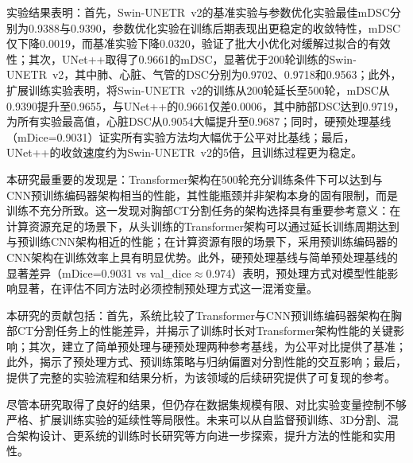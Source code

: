 \documentclass[12pt, a4paper]{article}
\begin{document}
实验结果表明：首先，Swin-UNETR~v2的基准实验与参数优化实验最佳mDSC分别为0.9388与0.9390，参数优化实验在训练后期表现出更稳定的收敛特性，mDSC仅下降0.0019，而基准实验下降0.0320，验证了批大小优化对缓解过拟合的有效性；其次，UNet++取得了0.9661的mDSC，显著优于200轮训练的Swin-UNETR~v2，其中肺、心脏、气管的DSC分别为0.9702、0.9718和0.9563；此外，扩展训练实验表明，将Swin-UNETR~v2的训练从200轮延长至500轮，mDSC从0.9390提升至0.9655，与UNet++的0.9661仅差0.0006，其中肺部DSC达到0.9719，为所有实验最高值，心脏DSC从0.9054大幅提升至0.9687；同时，硬预处理基线（mDice=0.9031）证实所有实验方法均大幅优于公平对比基线；最后，UNet++的收敛速度约为Swin-UNETR~v2的5倍，且训练过程更为稳定。

本研究最重要的发现是：Transformer架构在500轮充分训练条件下可以达到与CNN预训练编码器架构相当的性能，其性能瓶颈并非架构本身的固有限制，而是训练不充分所致。这一发现对胸部CT分割任务的架构选择具有重要参考意义：在计算资源充足的场景下，从头训练的Transformer架构可以通过延长训练周期达到与预训练CNN架构相近的性能；在计算资源有限的场景下，采用预训练编码器的CNN架构在训练效率上具有明显优势。此外，硬预处理基线与简单预处理基线的显著差异（mDice=0.9031 vs val\_dice$\approx$0.974）表明，预处理方式对模型性能影响显著，在评估不同方法时必须控制预处理方式这一混淆变量。

本研究的贡献包括：首先，系统比较了Transformer与CNN预训练编码器架构在胸部CT分割任务上的性能差异，并揭示了训练时长对Transformer架构性能的关键影响；其次，建立了简单预处理与硬预处理两种参考基线，为公平对比提供了基准；此外，揭示了预处理方式、预训练策略与归纳偏置对分割性能的交互影响；最后，提供了完整的实验流程和结果分析，为该领域的后续研究提供了可复现的参考。

尽管本研究取得了良好的结果，但仍存在数据集规模有限、对比实验变量控制不够严格、扩展训练实验的延续性等局限性。未来可以从自监督预训练、3D分割、混合架构设计、更系统的训练时长研究等方向进一步探索，提升方法的性能和实用性。

\printbibliography[heading=bibintoc, title={参考文献}]
\end{document}
